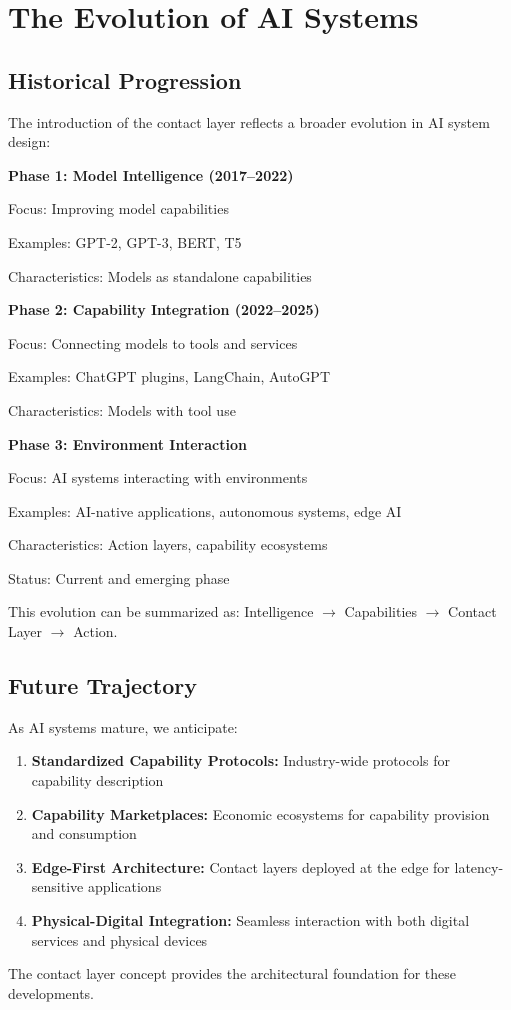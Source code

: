 \section{The Evolution of AI Systems}

\subsection{Historical Progression}

The introduction of the contact layer reflects a broader evolution in AI system design:

\textbf{Phase 1: Model Intelligence (2017--2022)}

Focus: Improving model capabilities

Examples: GPT-2, GPT-3, BERT, T5

Characteristics: Models as standalone capabilities

\textbf{Phase 2: Capability Integration (2022--2025)}

Focus: Connecting models to tools and services

Examples: ChatGPT plugins, LangChain, AutoGPT

Characteristics: Models with tool use

\textbf{Phase 3: Environment Interaction}

Focus: AI systems interacting with environments

Examples: AI-native applications, autonomous systems, edge AI

Characteristics: Action layers, capability ecosystems

Status: Current and emerging phase

This evolution can be summarized as: Intelligence $\to$ Capabilities $\to$ Contact Layer $\to$ Action.

\subsection{Future Trajectory}

As AI systems mature, we anticipate:
\begin{enumerate}[label=\arabic*.]
\item \textbf{Standardized Capability Protocols:} Industry-wide protocols for capability description
\item \textbf{Capability Marketplaces:} Economic ecosystems for capability provision and consumption
\item \textbf{Edge-First Architecture:} Contact layers deployed at the edge for latency-sensitive applications
\item \textbf{Physical-Digital Integration:} Seamless interaction with both digital services and physical devices
\end{enumerate}

The contact layer concept provides the architectural foundation for these developments.
